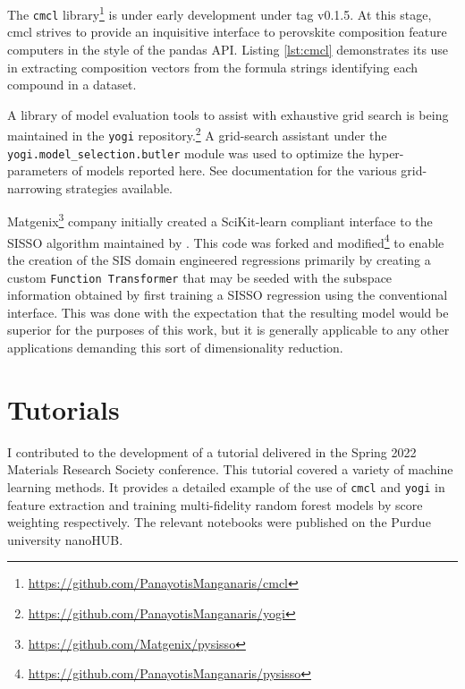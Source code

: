 The \texttt{cmcl} library\footnote{\url{https://github.com/PanayotisManganaris/cmcl}} is under early development under tag v0.1.5.
At this stage, cmcl strives to provide an inquisitive interface to perovskite composition feature computers in the style of the pandas API.
Listing \ref{lst:cmcl} demonstrates its use in extracting composition vectors from the formula strings identifying each compound in a dataset.

A library of model evaluation tools to assist with exhaustive grid search is being maintained in the \texttt{yogi} repository.\footnote{\url{https://github.com/PanayotisManganaris/yogi}}
A grid-search assistant under the \texttt{yogi.model\_selection.butler} module was used to optimize the hyper-parameters of models reported here.
See documentation for the various grid-narrowing strategies available.

Matgenix\footnote{\url{https://github.com/Matgenix/pysisso}} company initially created a SciKit-learn compliant interface to the SISSO algorithm maintained by \textcite{ouyang-2018-sisso}.
This code was forked and modified\footnote{\url{https://github.com/PanayotisManganaris/pysisso}} to enable the creation of the SIS domain engineered regressions primarily by creating a custom \texttt{Function Transformer} that may be seeded with the subspace information obtained by first training a SISSO regression using the conventional interface.
This was done with the expectation that the resulting model would be superior for the purposes of this work, but it is generally applicable to any other applications demanding this sort of dimensionality reduction.

\section{Tutorials}
\label{sec:org8d64117}
I contributed to the development of a tutorial delivered in the Spring 2022 Materials Research Society conference.
This tutorial covered a variety of machine learning methods.
It provides a detailed example of the use of \texttt{cmcl} and \texttt{yogi} in feature extraction and training multi-fidelity random forest models by score weighting respectively.
The relevant notebooks were published on the Purdue university nanoHUB.
